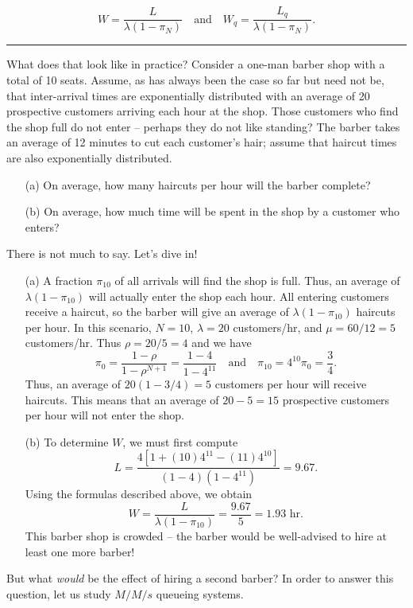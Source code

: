 $$ W = \frac{L}{\lambda\left(1-\pi_{N}\right)}\quad \text{and}\quad W_{q} = \frac{L_{q}}{\lambda\left(1-\pi_{N}\right)}.$$
\begin{center}
    \rule{0.5\textwidth}{.4pt}
\end{center}
What does that look like in practice? Consider a one-man barber shop with a total of 10 seats. Assume, as has always been the case so far but need not be, that inter-arrival times are exponentially distributed with an average of 20 prospective customers arriving each hour at the shop. Those customers who find the shop full do not enter -- perhaps they do not like standing? The barber takes an average of 12 minutes to cut each customer's hair; assume that haircut times are also exponentially distributed.
\begin{itemize}[noitemsep]
	\item[(a)] On average, how many haircuts per hour will the barber complete?
	\item[(b)] On average, how much time will be spent in the shop by a customer who enters?
\end{itemize}
There is not much to say. Let's dive in!
\begin{itemize}[noitemsep]
	\item[(a)] A fraction $\pi_{10}$ of all arrivals will find the shop is full. Thus, an average of $\lambda\left(1-\pi_{10}\right)$ will actually enter the shop each hour.  All entering customers receive a haircut, so the barber will give an average of $\lambda\left(1-\pi_{10}\right)$ haircuts per hour. In this scenario, $N=10$, $\lambda=20$ customers/hr, and $\mu=60/12 = 5 $ customers/hr. Thus $\rho= 20/5 = 4$ and  we have 
	$$ \pi_{0} = \frac{1-\rho}{1-\rho^{N+1}} = \frac{1-4}{1-4^{11}} \quad\text{and}\quad \pi_{10} = 4^{10} \pi_{0} = \frac{3}{4}.$$
Thus, an average of $20(1 - 3/4)= 5$ customers per hour will receive haircuts. This means that an average of $20 - 5 = 15$ prospective customers per hour will not enter the shop.	
\item[(b)] To determine $W$, we must first compute 
$$L = \frac{4 [1+ (10) 4^{11} - (11) 4^{10} ]}{(1-4)\left(1-4^{11}\right)} = 9.67.$$ 
Using the formulas described above, we obtain 
$$ W = \frac{L}{\lambda\left(1-\pi_{10}\right)} = \frac{9.67}{5} = 1.93 \text{ hr}.$$
This barber shop is crowded -- the barber would be well-advised to hire at least one more barber!
\end{itemize}
But what \textit{would} be the effect of hiring a second barber? In order to answer this question, let us study $M/M/s$ queueing systems.   
